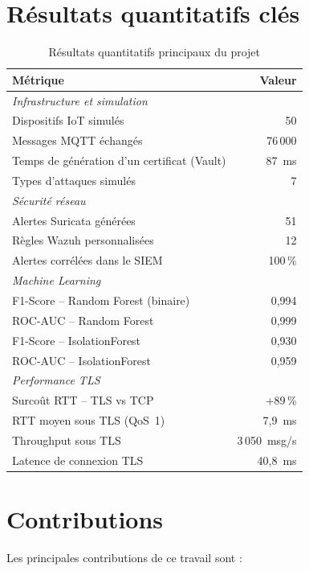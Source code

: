 \section{Résultats quantitatifs clés}

\begin{table}[H]
\centering
\caption{Résultats quantitatifs principaux du projet}
\label{tab:key_results}
\begin{tabular}{lr}
\toprule
\textbf{Métrique} & \textbf{Valeur} \\
\midrule
\multicolumn{2}{l}{\textit{Infrastructure et simulation}} \\
Dispositifs IoT simulés & 50 \\
Messages MQTT échangés & 76\,000 \\
Temps de génération d'un certificat (Vault) & 87~ms \\
Types d'attaques simulés & 7 \\
\midrule
\multicolumn{2}{l}{\textit{Sécurité réseau}} \\
Alertes Suricata générées & 51 \\
Règles Wazuh personnalisées & 12 \\
Alertes corrélées dans le SIEM & 100\,\% \\
\midrule
\multicolumn{2}{l}{\textit{Machine Learning}} \\
F1-Score -- Random Forest (binaire) & 0,994 \\
ROC-AUC -- Random Forest & 0,999 \\
F1-Score -- IsolationForest & 0,930 \\
ROC-AUC -- IsolationForest & 0,959 \\
\midrule
\multicolumn{2}{l}{\textit{Performance TLS}} \\
Surcoût RTT -- TLS vs TCP & +89\,\% \\
RTT moyen sous TLS (QoS~1) & 7,9~ms \\
Throughput sous TLS & 3\,050~msg/s \\
Latence de connexion TLS & 40,8~ms \\
\bottomrule
\end{tabular}
\end{table}

\section{Contributions}

Les principales contributions de ce travail sont :

